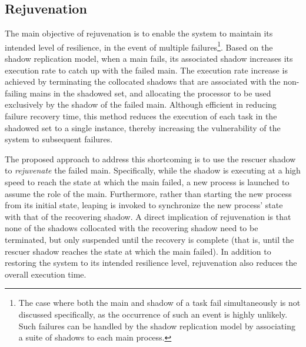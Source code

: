  

\subsection{Rejuvenation}

The main objective of rejuvenation is to enable the system to maintain its intended level of resilience, in the event of multiple failures\footnote{The case where both the main and shadow of a task fail simultaneously is not discussed specifically, as the occurrence of such an event is highly unlikely. Such failures can be handled by the shadow replication model by associating a suite of shadows to each main process.}. Based on the shadow replication model, when a main fails, its associated shadow increases its execution rate to catch up with the failed main. The execution rate increase is achieved by terminating  the collocated shadows that are associated with the non-failing mains in the shadowed set, and allocating the processor to be used exclusively by the shadow of the failed main. Although efficient in reducing failure recovery time, this method reduces the execution of each task in the shadowed set to a single instance, thereby increasing the vulnerability of the system to subsequent failures. 

The proposed approach to address this shortcoming is to use the rescuer shadow to \textit{rejuvenate} the failed main.  Specifically, while the shadow is executing at a high speed to reach the state at which the main failed, a new process is launched to assume the role of the main. Furthermore, rather than starting the new process from its initial state, leaping is invoked to  synchronize the new process' state with that of the recovering shadow. A direct implication of rejuvenation is that none of the shadows collocated with the recovering shadow need to be terminated, but only suspended  until the recovery is complete (that is, until the rescuer shadow reaches the state at which the main failed).  In addition to restoring the system to its intended resilience level, rejuvenation also reduces the overall execution time. 



